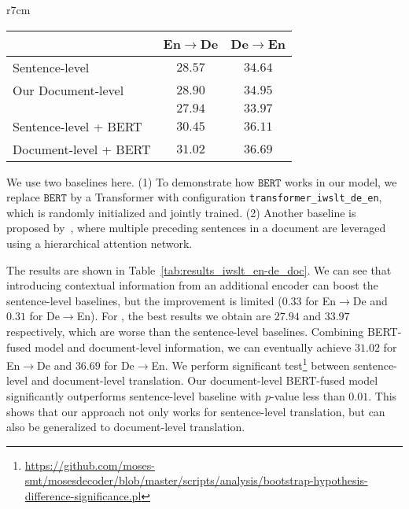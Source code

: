 \documentclass{article} \usepackage{iclr2020_conference,times}
\newcommand{\bert}{\texttt{BERT}}
\begin{document}
\begin{wraptable}{r}{7cm}
\vspace{-0.8cm}
\small
\centering
\caption{BLEU  of  document-level translation.}
\begin{tabular}{lcc}
\toprule
& En$\to$De & De$\to$En \\
\midrule
Sentence-level & $28.57$ & $34.64$ \\
\midrule
Our Document-level &$28.90$& $34.95$\\
\citet{miculicich2018document}&$27.94$&$33.97$ \\
\midrule
Sentence-level + BERT & $30.45$ & $36.11$ \\
Document-level + BERT & $31.02$ & $36.69$ \\
\bottomrule
\end{tabular}
\label{tab:results_iwslt_en-de_doc}
\vspace{-0.5cm}
\end{wraptable}

 We use two baselines here. (1) To demonstrate how $\bert$ works in our model, we replace $\bert$ by a Transformer with configuration \texttt{transformer\_iwslt\_de\_en}, which is randomly initialized and jointly trained. (2) Another baseline is proposed by~\cite{miculicich2018document}, where multiple preceding sentences in a document are leveraged using a hierarchical attention network.



 The results are shown in Table~\ref{tab:results_iwslt_en-de_doc}. We can see that introducing contextual information from an additional encoder can boost the sentence-level baselines, but the improvement is limited ($0.33$ for En$\to$De and $0.31$ for De$\to$En). For \citet{miculicich2018document}, the best results we obtain are $27.94$ and $33.97$ respectively, which are worse than the sentence-level baselines. Combining BERT-fused model and document-level information, we can eventually achieve $31.02$ for En$\to$De and $36.69$ for De$\to$En. 
We perform significant test\footnote{\url{https://github.com/moses-smt/mosesdecoder/blob/master/scripts/analysis/bootstrap-hypothesis-difference-significance.pl}} between sentence-level and document-level translation. Our document-level BERT-fused model significantly outperforms sentence-level baseline with $p$-value less than $0.01$. This shows that our approach not only works for sentence-level translation, but can also be generalized to document-level translation. 
\end{document}
